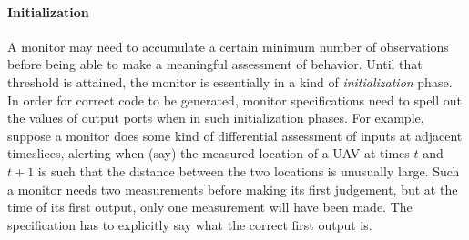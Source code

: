 \paragraph{Initialization}
A monitor may need to accumulate a certain minimum number of observations before being able to make a meaningful assessment of behavior. Until that threshold is attained, the monitor is essentially in a kind of \emph{initialization} phase. In order for correct code to be generated, monitor specifications need to spell out the values of output ports when in such initialization phases. For example, suppose a monitor does some kind of differential assessment of inputs at adjacent timeslices, alerting when (say) the measured location of a UAV at times $t$ and $t+1$ is such that the distance between the two locations is unusually large. Such a monitor needs two measurements before making its first judgement, but at the time of its first output, only one measurement will have been made. The specification has to explicitly say what the correct first output is.


